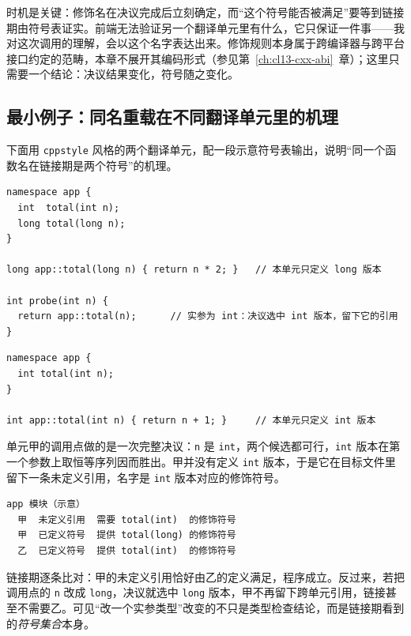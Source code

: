 \documentclass[12pt,a4paper,fontset=fandol]{ctexbook}
\newcommand{\Tp}[1]{\texttt{#1}}
\begin{document}
时机是关键：修饰名在决议完成后立刻确定，而“这个符号能否被满足”要等到链接期由符号表证实。前端无法验证另一个翻译单元里有什么，它只保证一件事——我对这次调用的理解，会以这个名字表达出来。修饰规则本身属于跨编译器与跨平台接口约定的范畴，本章不展开其编码形式（参见第~\ref{ch:cl13-cxx-abi}~章）；这里只需要一个结论：决议结果变化，符号随之变化。

\subsection{最小例子：同名重载在不同翻译单元里的机理}\label{sec:cl03-mangling-example}

下面用 \Tp{cppstyle} 风格的两个翻译单元，配一段示意符号表输出，说明“同一个函数名在链接期是两个符号”的机理。

\begin{lstlisting}[style=cppstyle,caption={翻译单元甲：声明齐备，但只定义 long 版本}]
namespace app {
  int  total(int n);
  long total(long n);
}

long app::total(long n) { return n * 2; }   // 本单元只定义 long 版本

int probe(int n) {
  return app::total(n);      // 实参为 int：决议选中 int 版本，留下它的引用
}
\end{lstlisting}

\begin{lstlisting}[style=cppstyle,caption={翻译单元乙：只定义 int 版本}]
namespace app {
  int total(int n);
}

int app::total(int n) { return n + 1; }     // 本单元只定义 int 版本
\end{lstlisting}

单元甲的调用点做的是一次完整决议：\Tp{n} 是 \Tp{int}，两个候选都可行，\Tp{int} 版本在第一个参数上取恒等序列因而胜出。甲并没有定义 \Tp{int} 版本，于是它在目标文件里留下一条未定义引用，名字是 \Tp{int} 版本对应的修饰符号。

\begin{lstlisting}[style=outstyle,caption={符号表输出（示意；实际修饰形式依平台与接口约定而定）}]
app 模块（示意）
  甲  未定义引用  需要 total(int)  的修饰符号
  甲  已定义符号  提供 total(long) 的修饰符号
  乙  已定义符号  提供 total(int)  的修饰符号
\end{lstlisting}

链接期逐条比对：甲的未定义引用恰好由乙的定义满足，程序成立。反过来，若把调用点的 \Tp{n} 改成 \Tp{long}，决议就选中 \Tp{long} 版本，甲不再留下跨单元引用，链接甚至不需要乙。可见“改一个实参类型”改变的不只是类型检查结论，而是链接期看到的\emph{符号集合}本身。
\end{document}
